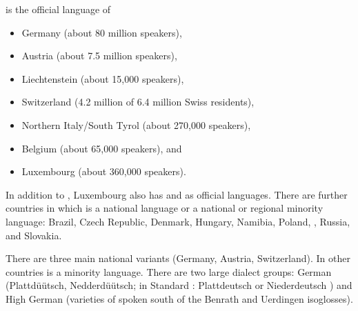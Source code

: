  is the official language of
\begin{itemize}
\item Germany (about 80 million speakers), 
\item Austria (about 7.5 million speakers), 
\item Liechtenstein (about 15,000 speakers), 
\item Switzerland (4.2 million of 6.4 million Swiss residents),
\item Northern Italy/South Tyrol (about 270,000 speakers), 
\item Belgium (about 65,000 speakers), and
\item Luxembourg (about 360,000 speakers).
\end{itemize}
In addition to , Luxembourg also has  and  as official
languages. 
There are further countries in which  is a national language or a national or regional
minority language: Brazil, Czech Republic, Denmark, Hungary, Namibia, Poland, , Russia, and Slovakia.


There are three main national variants (Germany, Austria, Switzerland). In other countries  is
a minority language. There are two large dialect groups: German (Plattdüütsch,
Nedderdüütsch; in Standard : Platt\-deutsch or Nie\-der\-deutsch%
) and High German (varieties of  spoken south of the Benrath and Uerdingen
isoglosses).

